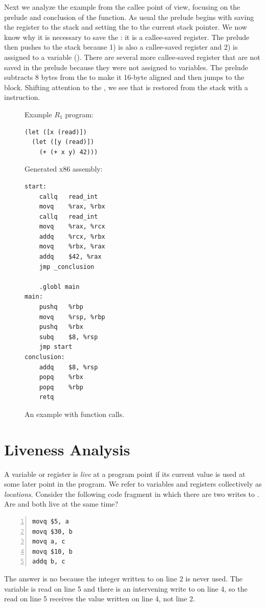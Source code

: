 \documentclass[11pt]{book}
\begin{document}
Next we analyze the example from the callee point of view, focusing on
the prelude and conclusion of the  function. As usual the
prelude begins with saving the  register to the stack and
setting the  to the current stack pointer. We now know why
it is necessary to save the : it is a callee-saved register.
The prelude then pushes  to the stack because 1) 
is also a callee-saved register and 2)  is assigned to a
variable (). There are several more callee-saved register that
are not saved in the prelude because they were not assigned to
variables. The prelude subtracts 8 bytes from the  to make
it 16-byte aligned and then jumps to the  block. Shifting
attention to the , we see that  is restored
from the stack with a  instruction.

\begin{figure}[tp]
\begin{minipage}{0.45\textwidth}
Example $R_1$ program:
\begin{lstlisting}
(let ([x (read)])
  (let ([y (read)])
    (+ (+ x y) 42)))
\end{lstlisting}
\end{minipage}
\begin{minipage}{0.45\textwidth}
Generated x86 assembly:
\begin{lstlisting}
start:
	callq	read_int
	movq	%rax, %rbx
	callq	read_int
	movq	%rax, %rcx
	addq	%rcx, %rbx
	movq	%rbx, %rax
	addq	$42, %rax
	jmp _conclusion

	.globl main
main:
	pushq	%rbp
	movq	%rsp, %rbp
	pushq	%rbx
	subq	$8, %rsp
	jmp start
conclusion:
	addq	$8, %rsp
	popq	%rbx
	popq	%rbp
	retq
\end{lstlisting}
\end{minipage}
\caption{An example with function calls.}
  \label{fig:example-calling-conventions}
\end{figure}

\clearpage

\section{Liveness Analysis}
\label{sec:liveness-analysis-r1}

A variable or register is \emph{live} at a program point if its
current value is used at some later point in the program.  We 
refer to variables and registers collectively as \emph{locations}.
%
Consider the following code fragment in which there are two writes to
. Are  and  both live at the same time?
\begin{lstlisting}[numbers=left,numberstyle=\tiny]
movq $5, a
movq $30, b
movq a, c
movq $10, b
addq b, c
\end{lstlisting}
The answer is no because the integer  written to  on
line 2 is never used. The variable  is read on line 5 and
there is an intervening write to  on line 4, so the read on
line 5 receives the value written on line 4, not line 2.
\end{document}
